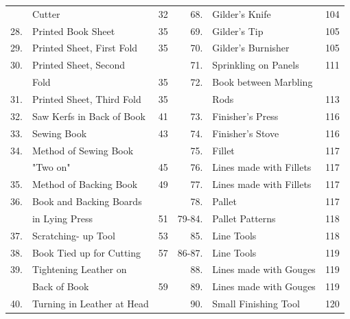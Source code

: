 \documentclass[twoside]{book}
\begin{document}
\begin{tiny}
\begin{tabular}{r l r r l r }
       & Cutter                    \dotfill & 32     &    68. & Gilder's Knife              \dotfill & 104 \\ 
28.    & Printed Book Sheet        \dotfill & 35     &    69. & Gilder's Tip                \dotfill & 105 \\ 
29.    & Printed Sheet, First Fold \dotfill & 35     &    70. & Gilder's Burnisher          \dotfill & 105 \\ 
30.    & Printed Sheet, Second              &        &    71. & Sprinkling on Panels        \dotfill & 111 \\ 
       & Fold                      \dotfill & 35     &    72. & Book between Marbling                &     \\ 
31.    & Printed Sheet, Third Fold \dotfill & 35     &        & Rods                        \dotfill & 113 \\ 
32.    & Saw Kerfs in Back of Book \dotfill & 41     &    73. & Finisher's Press            \dotfill & 116 \\ 
33.    & Sewing Book               \dotfill & 43     &    74. & Finisher's Stove            \dotfill & 116 \\ 
34.    & Method of Sewing Book              &        &    75. & Fillet                      \dotfill & 117 \\ 
       & "Two on"                  \dotfill & 45     &    76. & Lines made with Fillets     \dotfill & 117 \\ 
35.    & Method of Backing Book    \dotfill & 49     &    77. & Lines made with Fillets     \dotfill & 117 \\ 
36.    & Book and Backing Boards            &        &    78. & Pallet                      \dotfill & 117 \\ 
       & in Lying Press            \dotfill & 51     & 79-84. & Pallet Patterns             \dotfill & 118 \\ 
37.    & Scratching- up Tool       \dotfill & 53     &    85. & Line Tools                  \dotfill & 118 \\ 
38.    & Book Tied up for Cutting  \dotfill & 57     & 86-87. & Line Tools                  \dotfill & 119 \\ 
39.    & Tightening Leather on              &        &    88. & Lines made with Gouges      \dotfill & 119 \\ 
       & Back of Book              \dotfill & 59     &    89. & Lines made with Gouges      \dotfill & 119 \\ 
40.    & Turning in Leather at Head         &        &    90. & Small Finishing Tool        \dotfill & 120 \\ 

\end{tabular}
\end{tiny}
\end{document}
